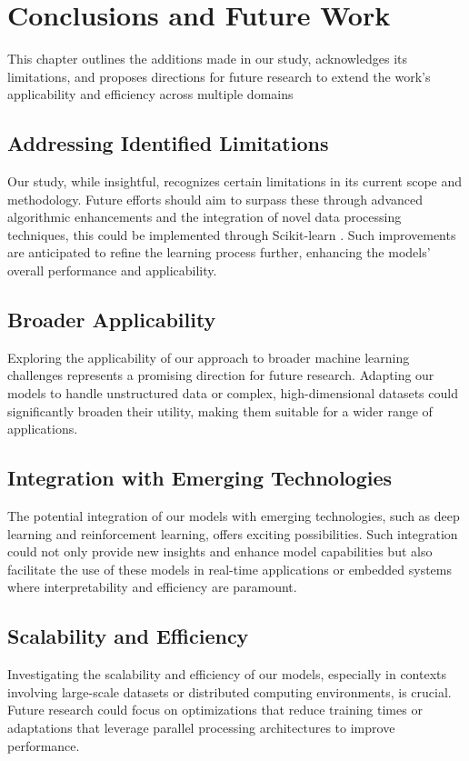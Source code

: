 \documentclass[a4paper, 12pt]{report}
\begin{document}
\chapter{Conclusions and Future Work}
\label{ch:Conclusions and Future Work}
This chapter outlines the additions made in our study, acknowledges its limitations, and proposes directions for future research to extend 
the work's applicability and efficiency across multiple domains

\section{Addressing Identified Limitations}
Our study, while insightful, recognizes certain limitations in its current scope and methodology. 
Future efforts should aim to surpass these through advanced algorithmic enhancements and the integration of novel data processing techniques, this could be implemented through 
Scikit-learn \cite{scikit}. Such improvements are anticipated to refine the learning process further, enhancing the models' overall performance and applicability.

\section{Broader Applicability}
Exploring the applicability of our approach to broader machine learning challenges represents a promising direction for future research. 
Adapting our models to handle unstructured data or complex, high-dimensional datasets could significantly broaden their utility, making them suitable for a wider range of applications.

\section{Integration with Emerging Technologies}
The potential integration of our models with emerging technologies, such as deep learning and reinforcement learning, offers exciting possibilities. 
Such integration could not only provide new insights and enhance model capabilities but also facilitate the use of these models in real-time applications or 
embedded systems where interpretability and efficiency are paramount.

\section{Scalability and Efficiency}
Investigating the scalability and efficiency of our models, especially in contexts involving large-scale datasets or distributed computing environments, is crucial. 
Future research could focus on optimizations that reduce training times or adaptations that leverage parallel processing architectures to improve performance.
\end{document}
